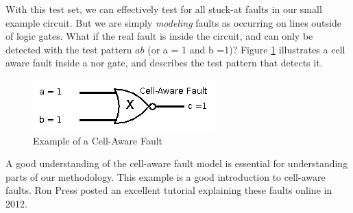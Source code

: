 With this test set, we can effectively test for all stuck-at faults in our small example circuit. 
But we are simply \textit{modeling} faults as occurring on lines outside of logic gates.
What if the real fault is inside the circuit, and can only be detected with the test pattern $ab$ (or a = 1 and b =1)? 
Figure \ref{fig:caf} illustrates a cell aware fault inside a nor gate, and describes the test pattern that detects it. 

\begin{figure}[h!]
\centering
\caption{Example of a Cell-Aware Fault\label{fig:caf}}
\includegraphics[scale=0.5]{Figures/caf.png}
\end{figure}  

A good understanding of the cell-aware fault model is essential for understanding parts of our methodology.
This example is a good introduction to cell-aware faults.
Ron Press posted an excellent tutorial explaining these faults online in 2012\cite{ronpress}.